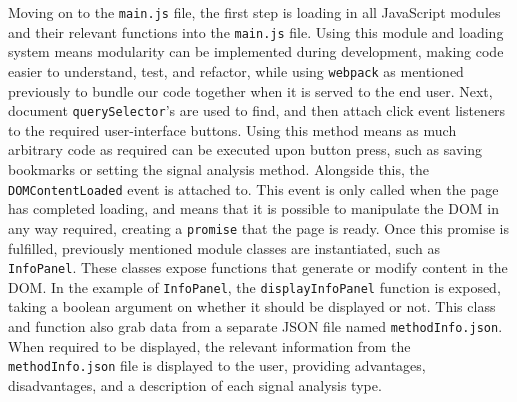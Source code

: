 Moving on to the \verb|main.js| file, the first step is loading in all JavaScript modules and their relevant functions into the \verb|main.js| file. Using this module and loading system means modularity can
be implemented during development, making code easier to understand, test, and refactor, while using \verb|webpack| as mentioned previously to bundle our code together when it is served to the end user.
Next, document \verb|querySelector|'s are used to find, and then attach click event listeners to the required user-interface buttons. Using this method means as much arbitrary code as required can be
executed upon button press, such as saving bookmarks or setting the signal analysis method.
Alongside this, the \verb|DOMContentLoaded| event is attached to. This event is only called when the page has completed loading, and means that it is possible to manipulate the DOM in any way required,
creating a \verb|promise| that the page is ready.
Once this promise is fulfilled, previously mentioned module classes are instantiated, such as \verb|InfoPanel|. These classes expose functions that generate or modify content in the DOM. In the example 
of \verb|InfoPanel|, the \verb|displayInfoPanel| function is exposed, taking a boolean argument on whether it should be displayed or not. This class and function also grab data from a separate JSON
file named \verb|methodInfo.json|. When required to be displayed, the relevant information from the \verb|methodInfo.json| file is displayed to the user, providing advantages, disadvantages, and a description
of each signal analysis type.


